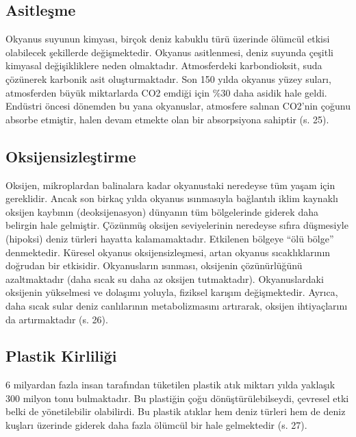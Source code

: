 \documentclass[
]{book}
\begin{document}
\hypertarget{asitleux15fme}{%
\subsection{Asitleşme}\label{asitleux15fme}}

Okyanus suyunun kimyası, birçok deniz kabuklu türü üzerinde ölümcül etkisi olabilecek şekillerde değişmektedir. Okyanus asitlenmesi, deniz suyunda çeşitli kimyasal değişikliklere neden olmaktadır. Atmosferdeki karbondioksit, suda çözünerek karbonik asit oluşturmaktadır. Son 150 yılda okyanus yüzey suları, atmosferden büyük miktarlarda CO2 emdiği için \%30 daha asidik hale geldi. Endüstri öncesi dönemden bu yana okyanuslar, atmosfere salınan CO2'nin çoğunu absorbe etmiştir, halen devam etmekte olan bir absorpsiyona sahiptir (s. 25). \citep{bush2020}

\hypertarget{oksijensizleux15ftirme}{%
\subsection{Oksijensizleştirme}\label{oksijensizleux15ftirme}}

Oksijen, mikroplardan balinalara kadar okyanustaki neredeyse tüm yaşam için gereklidir. Ancak son birkaç yılda okyanus ısınmasıyla bağlantılı iklim kaynaklı oksijen kaybının (deoksijenasyon) dünyanın tüm bölgelerinde giderek daha belirgin hale gelmiştir. Çözünmüş oksijen seviyelerinin neredeyse sıfıra düşmesiyle (hipoksi) deniz türleri hayatta kalamamaktadır. Etkilenen bölgeye ``ölü bölge'' denmektedir. Küresel okyanus oksijensizleşmesi, artan okyanus sıcaklıklarının doğrudan bir etkisidir. Okyanusların ısınması, oksijenin çözünürlüğünü azaltmaktadır (daha sıcak su daha az oksijen tutmaktadır). Okyanuslardaki oksijenin yükselmesi ve dolaşımı yoluyla, fiziksel karışım değişmektedir. Ayrıca, daha sıcak sular deniz canlılarının metabolizmasını artırarak, oksijen ihtiyaçlarını da artırmaktadır (s. 26). \citep{bush2020}

\hypertarget{plastik-kirliliux11fi}{%
\subsection{Plastik Kirliliği}\label{plastik-kirliliux11fi}}

6 milyardan fazla insan tarafından tüketilen plastik atık miktarı yılda yaklaşık 300 milyon tonu bulmaktadır. Bu plastiğin çoğu dönüştürülebilseydi, çevresel etki belki de yönetilebilir olabilirdi. Bu plastik atıklar hem deniz türleri hem de deniz kuşları üzerinde giderek daha fazla ölümcül bir hale gelmektedir (s. 27). \citep{bush2020}
\end{document}
